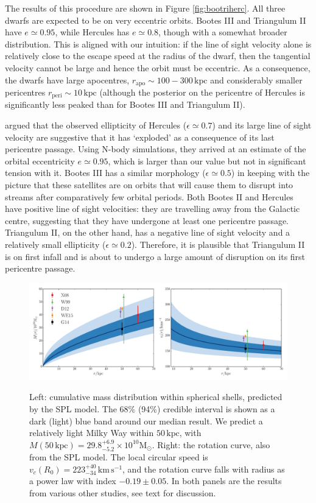 \documentclass[useAMS,twocolumn,usenatbib]{mn2e}
\def\kpc{{\,\mathrm{kpc}}}
\def\kms{{\,\mathrm{km\,s^{-1}}}}
\def\rp{{r_\mathrm{peri}}}
\def\ra{{r_\mathrm{apo}}}
\def\ecc{{e}}
\begin{document}
The results of this procedure are shown in Figure \ref{fig:bootriherc}. 
All three dwarfs are expected to be on very eccentric orbits. 
Bootes III and Triangulum II have $e \simeq 0.95$, while Hercules has $e \simeq 0.8$, though with a somewhat broader distribution. 
This is aligned with our intuition: if the line of sight velocity alone is relatively close to the escape speed at the radius of the dwarf, then the tangential velocity cannot be large and hence the orbit must be eccentric. 
As a consequence, the dwarfs have large apocentres, $\ra \sim 100 - 300\kpc$ and considerably smaller pericentres $\rp \sim 10\kpc$ (although the posterior on the pericentre of Hercules is significantly less peaked than for Bootes III and Triangulum II).

\citet{Ku16} argued that the observed ellipticity of Hercules ($\epsilon \simeq 0.7$) and its large line of sight velocity are suggestive that it has `exploded' as a consequence of its last pericentre passage. 
Using N-body simulations, they arrived at an estimate of the orbital eccentricity $\ecc \simeq 0.95$, which is larger than our value but not in significant tension with it. 
Bootes III has a similar morphology ($\epsilon \simeq 0.5$) in keeping with the picture that these satellites are on orbits that will cause them to disrupt into streams after comparatively few orbital periods. 
Both Bootes II and Hercules have positive line of sight velocities: they are travelling away from the Galactic centre, suggesting that they have undergone at least one pericentre passage. 
Triangulum II, on the other hand, has a negative line of sight velocity and a relatively small ellipticity ($\epsilon \simeq 0.2$). 
Therefore, it is plausible that Triangulum II is on first infall and is about to undergo a large amount of disruption on its first pericentre passage.

\begin{figure}
\includegraphics[width=2\columnwidth]{plots/spherical_powerlaw_massenclosed}\\
\caption{Left: cumulative mass distribution within spherical shells, predicted by the SPL model. 
The 68\% (94\%) credible interval is shown as a dark (light) blue band around our median result. 
We predict a relatively light Milky Way within $50\kpc$, with $M(50\kpc)=29.8^{+6.9}_{-5.2} \times 10^{10}\mathrm{M}_\odot$.
Right: the rotation curve, also from the SPL model. 
The local circular speed is $v_c(R_0) = 223^{+40}_{-34}\kms$, and the rotation curve falls with radius as a power law with index $-0.19\pm0.05$.
In both panels are the results from various other studies, see text for discussion.}
\label{fig:mass}
\end{figure}
\end{document}
